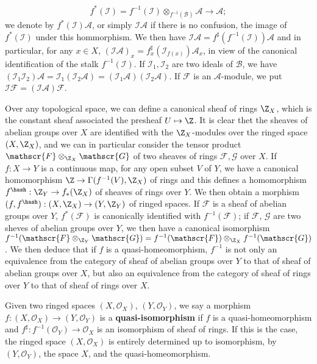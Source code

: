 \[f^*(\mathscr{I})=f^{-1}(\mathscr{I})\otimes_{f^{-1}(\mathscr{B})}\mathscr{A}\to\mathscr{A};\]
we denote by $f^*(\mathscr{I})\mathscr{A}$, or simply $\mathscr{I}\mathscr{A}$ if there is no confusion, the image of $f^*(\mathscr{I})$ under this hommorphism. We then have $\mathscr{I}\mathscr{A}=f^{\sharp}(f^{-1}(\mathscr{I}))\mathscr{A}$ and in particular, for any $x\in X$, $(\mathscr{I}\mathscr{A})_x=f^{\sharp}_x(\mathscr{I}_{f(x)})\mathscr{A}_x$, in view of the canonical identification of the stalk $f^{-1}(\mathscr{I})$. If $\mathscr{I}_1,\mathscr{I}_2$ are two ideals of $\mathscr{B}$, we have $(\mathscr{I}_1\mathscr{I}_2)\mathscr{A}=\mathscr{I}_1(\mathscr{I}_2\mathscr{A})=(\mathscr{I}_1\mathscr{A})(\mathscr{I}_2\mathscr{A})$. If $\mathscr{F}$ is an $\mathscr{A}$-module, we put $\mathscr{I}\mathscr{F}=(\mathscr{I}\mathscr{A})\mathscr{F}$.
\begin{remark}
Over any topological space, we can define a canonical sheaf of rings $\Z_X$, which is the constant sheaf associated the presheaf $U\mapsto\Z$. It is clear thet the sheaves of abelian groups over $X$ are identified with the $\Z_X$-modules over the ringed space $(X,\Z_X)$, and we can in particular consider the tensor product $\mathscr{F}\otimes_{\Z_X}\mathscr{G}$ of two sheaves of rings $\mathscr{F},\mathscr{G}$ over $X$. If $f:X\to Y$ is a continuous map, for any open subset $V$ of $Y$, we have a canonical homomorphism $\Z\to\Gamma(f^{-1}(V),\Z_X)$ of rings and this defines a homomorphism $f^{\hash}:\Z_Y\to f_*(\Z_X)$ of sheaves of rings over $Y$. We then obtain a morphism $(f,f^{\hash}):(X,\Z_X)\to(Y,\Z_Y)$ of ringed spaces. If $\mathscr{F}$ is a sheaf of abelian groups over $Y$, $f^*(\mathscr{F})$ is canonically identified with $f^{-1}(\mathscr{F})$; if $\mathscr{F}$, $\mathscr{G}$ are two sheves of abelian groups over $Y$, we then have a canonical isomorphism $f^{-1}(\mathscr{F}\otimes_{\Z_Y}\mathscr{G})=f^{-1}(\mathscr{F})\otimes_{\Z_X}f^{-1}(\mathscr{G})$. We then deduce that if $f$ is a quasi-homeomorphism, $f^{-1}$ is not only an equivalence from the category of sheaf of abelian groups over $Y$ to that of sheaf of abelian groups over $X$, but also an equivalence from the category of sheaf of rings over $Y$ to that of sheaf of rings over $X$.\par
Given two ringed spaces $(X,\mathscr{O}_X)$, $(Y,\mathscr{O}_Y)$, we say a morphism $f:(X,\mathscr{O}_X)\to(Y,\mathscr{O}_Y)$ is a \textbf{quasi-isomorphism} if $f$ is a quasi-homeomorphism and $f^{\sharp}:f^{-1}(\mathscr{O}_Y)\to\mathscr{O}_X$ is an isomorphism of sheaf of rings. If this is the case, the ringed space $(X,\mathscr{O}_X)$ is entirely determined up to isomorphism, by $(Y,\mathscr{O}_Y)$, the space $X$, and the quasi-homeomorphism.\par

\end{remark}
